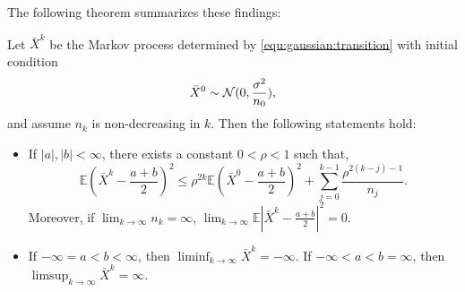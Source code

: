 The following theorem summarizes these findings:

\begin{theorem}
\label{thm:gaussian:limit}
Let $\bar{X}^k$ be the Markov process determined by \eqref{equ:gaussian:transition} with initial condition
\begin{align}
    \bar{X}^0 \sim \mathcal{N}(0,\frac{\sigma^2}{n_0}),\notag
\end{align}
and assume $n_k$ is non-decreasing in $k$.
Then the following statements hold:

\begin{itemize} 
    \item If $|a|,|b| < \infty$, there exists a constant $0<\rho < 1$ such that, 
    \[\mathbb{E}\left(\bar{X}^k - \frac{a+b}{2}\right)^2 \leq \rho^{2k}\mathbb{E}(\bar{X}^0-\frac{a+b}{2})^2+\sum_{j=0}^{k-1}\frac{\rho^{2(k-j)-1}}{n_j}.\]
    Moreover, if $\lim_{k \to \infty} n_k = \infty$, $\lim_{k \to \infty} \mathbb{E}|\bar{X}^k - \frac{a+b}{2}|^2 = 0$.
    \item If $-\infty=a<b<\infty$, then $\liminf_{k \to \infty} \bar{X}^k = -\infty$. If $-\infty<a<b=\infty$, then $\limsup_{k \to \infty} \bar{X}^k = \infty$.
\end{itemize}

\end{theorem}
